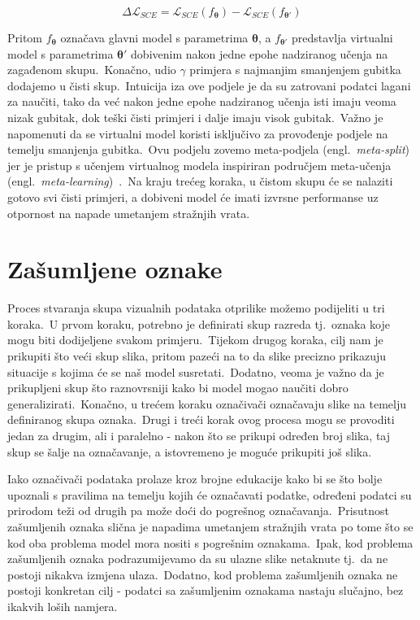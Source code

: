 \documentclass[diplomskirad]{fer}
\begin{document}
\begin{equation}
  \Delta \mathcal{L}_{SCE} = \mathcal{L}_{SCE}(f_{\bm{\theta}}) - \mathcal{L}_{SCE}(f_{\bm{\theta'}})
  \label{eq:asd}
\end{equation}

Pritom $f_{\bm{\theta}}$ označava glavni model s parametrima $\bm{\theta}$, a $f_{\bm{\theta'}}$ predstavlja virtualni model s parametrima $\bm{\theta'}$ dobivenim nakon jedne epohe nadziranog učenja na zagađenom skupu.\ 
Konačno, udio $\gamma$ primjera s najmanjim smanjenjem gubitka dodajemo u čisti skup.\ Intuicija iza ove podjele je da su zatrovani podatci lagani za naučiti, tako da već nakon jedne epohe nadziranog učenja isti imaju veoma nizak gubitak, dok teški čisti primjeri i dalje imaju visok gubitak.\ 
Važno je napomenuti da se virtualni model koristi isključivo za provođenje podjele na temelju smanjenja gubitka.\ 
Ovu podjelu zovemo meta-podjela (engl.\ \textit{meta-split}) jer je pristup s učenjem virtualnog modela inspiriran područjem meta-učenja (engl.\ \textit{meta-learning})~\cite{vilalta2002perspective}.\
Na kraju trećeg koraka, u čistom skupu će se nalaziti gotovo svi čisti primjeri, a dobiveni model će imati izvrsne performanse uz otpornost na napade umetanjem stražnjih vrata.\

\chapter{Zašumljene oznake}
\label{pog:zasumljene}

Proces stvaranja skupa vizualnih podataka otprilike možemo podijeliti u tri koraka.\ U prvom koraku, potrebno je definirati skup razreda tj.\ oznaka koje mogu biti dodijeljene svakom primjeru.\ 
Tijekom drugog koraka, cilj nam je prikupiti što veći skup slika, pritom pazeći na to da slike precizno prikazuju situacije s kojima će se naš model susretati.\ Dodatno, veoma je važno da je prikupljeni skup što raznovrsniji kako bi model mogao naučiti dobro generalizirati.\ 
Konačno, u trećem koraku označivači označavaju slike na temelju definiranog skupa oznaka.\ Drugi i treći korak ovog procesa mogu se provoditi jedan za drugim, ali i paralelno - nakon što se prikupi određen broj slika, taj skup se šalje na označavanje, a istovremeno je moguće prikupiti još slika.\ 
  
Iako označivači podataka prolaze kroz brojne edukacije kako bi se što bolje upoznali s pravilima na temelju kojih će označavati podatke, određeni podatci su prirodom teži od drugih pa može doći do pogrešnog označavanja.\ 
Prisutnost zašumljenih oznaka slična je napadima umetanjem stražnjih vrata po tome što se kod oba problema model mora nositi s pogrešnim oznakama.\ Ipak, kod problema zašumljenih oznaka podrazumijevamo da su ulazne slike netaknute tj.\ da ne postoji nikakva izmjena ulaza.\ 
Dodatno, kod problema zašumljenih oznaka ne postoji konkretan cilj - podatci sa zašumljenim oznakama nastaju slučajno, bez ikakvih loših namjera.\ 
  
\end{document}
